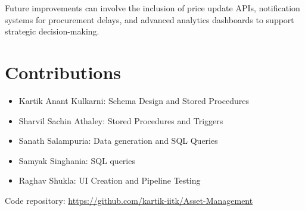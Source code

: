 \documentclass[11pt]{article}
\begin{document}
Future improvements can involve the inclusion of price update APIs, notification systems for procurement delays, and advanced analytics dashboards to support strategic decision-making.

\section{Contributions}
\begin{itemize}
  \item Kartik Anant Kulkarni: Schema Design and Stored Procedures
  \item Sharvil Sachin Athaley: Stored Procedures and Triggers
  \item Sanath Salampuria: Data generation and SQL Queries
  \item Samyak Singhania: SQL queries
  \item Raghav Shukla: UI Creation and Pipeline Testing
\end{itemize}

Code repository: \url{https://github.com/kartik-iitk/Asset-Management}
\end{document}
